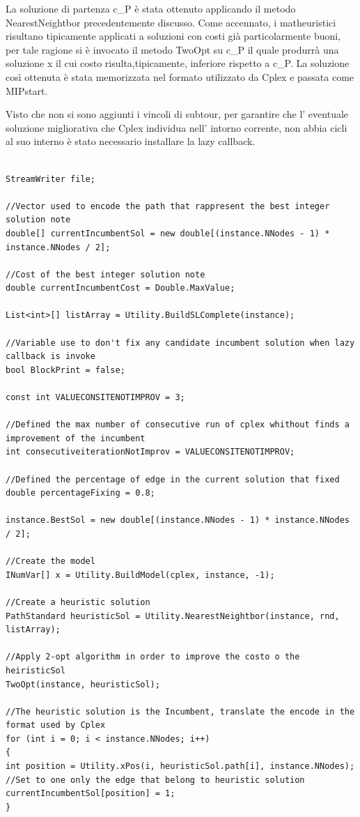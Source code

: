 \documentclass[11pt]{article}
\begin{document}
La soluzione di partenza c_P è stata ottenuto applicando il metodo NearestNeightbor precedentemente discusso. Come accennato, i matheuristici risultano tipicamente applicati a soluzioni  con costi già particolarmente buoni, per tale ragione si è invocato il metodo TwoOpt su c_P il quale produrrà una soluzione x il cui costo risulta,tipicamente, inferiore rispetto a c_P. La soluzione così ottenuta è stata memorizzata nel formato utilizzato da Cplex e passata come MIPstart.

Visto che non si sono aggiunti i vincoli di subtour, per garantire che l' eventuale soluzione migliorativa che Cplex  individua nell' intorno corrente, non abbia cicli al suo interno è stato necessario installare la lazy callback.

\begin{lstlisting}

StreamWriter file;

//Vector used to encode the path that rappresent the best integer solution note
double[] currentIncumbentSol = new double[(instance.NNodes - 1) * instance.NNodes / 2];

//Cost of the best integer solution note
double currentIncumbentCost = Double.MaxValue;

List<int>[] listArray = Utility.BuildSLComplete(instance);

//Variable use to don't fix any candidate incumbent solution when lazy callback is invoke
bool BlockPrint = false;

const int VALUECONSITENOTIMPROV = 3;

//Defined the max number of consecutive run of cplex whithout finds a improvement of the incumbent
int consecutiveiterationNotImprov = VALUECONSITENOTIMPROV;

//Defined the percentage of edge in the current solution that fixed 
double percentageFixing = 0.8;

instance.BestSol = new double[(instance.NNodes - 1) * instance.NNodes / 2];

//Create the model
INumVar[] x = Utility.BuildModel(cplex, instance, -1);

//Create a heuristic solution
PathStandard heuristicSol = Utility.NearestNeightbor(instance, rnd, listArray);

//Apply 2-opt algorithm in order to improve the costo o the heiristicSol
TwoOpt(instance, heuristicSol);

//The heuristic solution is the Incumbent, translate the encode in the format used by Cplex
for (int i = 0; i < instance.NNodes; i++)
{
int position = Utility.xPos(i, heuristicSol.path[i], instance.NNodes);
//Set to one only the edge that belong to heuristic solution
currentIncumbentSol[position] = 1;
}


\end{lstlisting}
\end{document}
